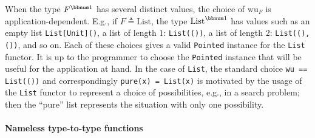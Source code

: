 When the type $F^{\bbnum 1}$ has several distinct values, the choice
of $\text{wu}_{F}$ is application-dependent. E.g., if $F\triangleq\text{List}$,
the type $\text{List}^{\bbnum 1}$ has values such as an empty list
\lstinline!List[Unit]()!, a list of length $1$: \lstinline!List(())!,
a list of length $2$: \lstinline!List((), ())!, and so on. Each
of these choices gives a valid \lstinline!Pointed! instance for the
\lstinline!List! functor. It is up to the programmer to choose the
\lstinline!Pointed! instance that will be useful for the application
at hand. In the case of \lstinline!List!, the standard choice \lstinline!wu == List(())!
and correspondingly \lstinline!pure(x) = List(x)! is motivated by
the usage of the \lstinline!List! functor to represent a choice of
possibilities, e.g., in a search problem; then the \textsf{``}pure\textsf{''} list
represents the situation with only one possibility.

\paragraph{Nameless type-to-type functions}

